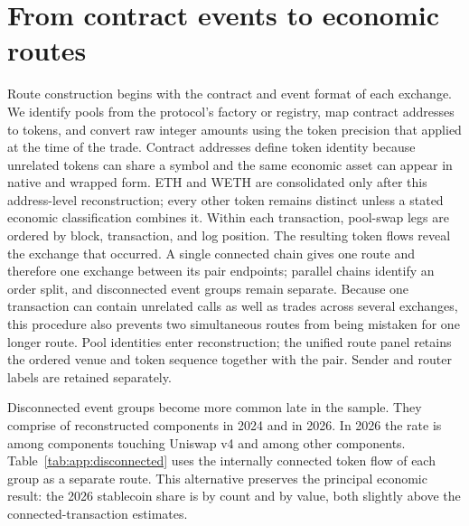%

\appendix

\section{From contract events to economic routes}
\label{app:route-construction}

Route construction begins with the contract and event format of each exchange. We identify pools from the protocol's factory or registry, map contract addresses to tokens, and convert raw integer amounts using the token precision that applied at the time of the trade. Contract addresses define token identity because unrelated tokens can share a symbol and the same economic asset can appear in native and wrapped form. ETH and WETH are consolidated only after this address-level reconstruction; every other token remains distinct unless a stated economic classification combines it. Within each transaction, pool-swap legs are ordered by block, transaction, and log position. The resulting token flows reveal the exchange that occurred. A single connected chain gives one route and therefore one exchange between its pair endpoints; parallel chains identify an order split, and disconnected event groups remain separate. Because one transaction can contain unrelated calls as well as trades across several exchanges, this procedure also prevents two simultaneous routes from being mistaken for one longer route. Pool identities enter reconstruction; the unified route panel retains the ordered venue and token sequence together with the pair. Sender and router labels are retained separately.

Disconnected event groups become more common late in the sample. They comprise \DisconnectedShareBase{} of reconstructed components in 2024 and \DisconnectedShareEnd{} in 2026. In 2026 the rate is \DisconnectedVFourShareEnd{} among components touching Uniswap v4 and \DisconnectedOtherShareEnd{} among other components. Table~\ref{tab:app:disconnected} uses the internally connected token flow of each group as a separate route. This alternative preserves the principal economic result: the 2026 stablecoin share is \ComponentRouteCountEnd{} by count and \ComponentRouteValueEnd{} by value, both slightly above the connected-transaction estimates.

